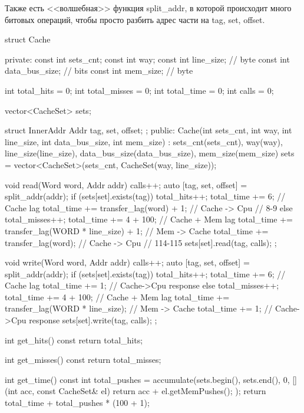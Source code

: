 \documentclass[14pt, russian, onesize]{extreport}
\begin{document}
Также есть <<волшебная>> функция split\_addr,
в которой происходит много битовых операций, чтобы просто 
разбить адрес части на tag, set, offset.
\begin{cppcode}
struct Cache { 
private:
    const int sets_cnt;
    const int way;
    const int line_size;        // byte
    const int data_bus_size;    // bits
    const int mem_size;         // byte

    int total_hits = 0;
    int total_misses = 0;
    int total_time = 0;
    int calls = 0;

    vector<CacheSet> sets;

    struct InnerAddr {
        Addr tag, set, offset;
    };
public:
    Cache(int sets_cnt, int way, int line_size, int data_bus_size, int mem_size) :
        sets_cnt(sets_cnt), way(way), line_size(line_size), data_bus_size(data_bus_size), mem_size(mem_size) {
        sets = vector<CacheSet>(sets_cnt, CacheSet(way, line_size));
    }

    void read(Word word, Addr addr) {
        calls++;
        auto [tag, set, offset] = split_addr(addr); 
        if (sets[set].exists(tag)) {
            total_hits++;
            total_time += 6; // Cache lag
            total_time += transfer_lag(word) + 1; // Cache -> Cpu
                                                  // 8-9
        } else {
            total_misses++;
            total_time += 4 + 100; // Cache + Mem lag
            total_time += transfer_lag(WORD * line_size) + 1; // Mem -> Cache
            total_time += transfer_lag(word); // Cache -> Cpu
                                              // 114-115
        }
        sets[set].read(tag, calls);
    };

    void write(Word word, Addr addr) {
        calls++;
        auto [tag, set, offset] = split_addr(addr); 
        if (sets[set].exists(tag)) {
            total_hits++;
            total_time += 6; // Cache lag 
            total_time += 1; // Cache->Cpu response
        } else {
            total_misses++;
            total_time += 4 + 100;                        // Cache + Mem lag
            total_time += transfer_lag(WORD * line_size); // Mem -> Cache
            total_time += 1; // Cache->Cpu response
        }
        sets[set].write(tag, calls);
    };

    int get_hits() const  {
        return total_hits;
    }

    int get_misses() const {
        return total_misses;
    }

    int get_time() const {
        int total_pushes = accumulate(sets.begin(), sets.end(), 0,
            [] (int acc, const CacheSet& el) {
                return acc + el.getMemPushes();
            }
        );
        return total_time + total_pushes * (100 + 1);
    }

}
\end{cppcode}
\end{document}
